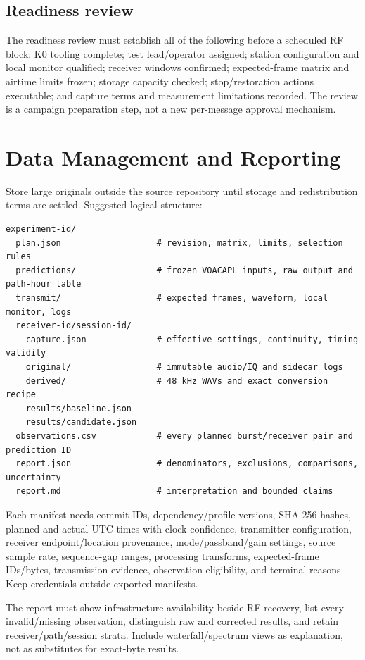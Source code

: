 \documentclass[11pt,a4paper]{article}
\begin{document}
\subsection{Readiness review}
\label{tp:readiness}

The readiness review must establish all of the following before a scheduled RF block: K0 tooling complete; test lead/operator assigned; station configuration and local monitor qualified; receiver windows confirmed; expected-frame matrix and airtime limits frozen; storage capacity checked; stop/restoration actions executable; and capture terms and measurement limitations recorded. The review is a campaign preparation step, not a new per-message approval mechanism.


\section{Data Management and Reporting}
\label{md:10}

Store large originals outside the source repository until storage and redistribution terms are settled. Suggested logical structure:

\begin{lstlisting}
experiment-id/
  plan.json                   # revision, matrix, limits, selection rules
  predictions/                # frozen VOACAPL inputs, raw output and path-hour table
  transmit/                   # expected frames, waveform, local monitor, logs
  receiver-id/session-id/
    capture.json              # effective settings, continuity, timing validity
    original/                 # immutable audio/IQ and sidecar logs
    derived/                  # 48 kHz WAVs and exact conversion recipe
    results/baseline.json
    results/candidate.json
  observations.csv            # every planned burst/receiver pair and prediction ID
  report.json                 # denominators, exclusions, comparisons, uncertainty
  report.md                   # interpretation and bounded claims
\end{lstlisting}
Each manifest needs commit IDs, dependency/profile versions, SHA-256 hashes, planned and actual UTC times with clock confidence, transmitter configuration, receiver endpoint/location provenance, mode/passband/gain settings, source sample rate, sequence-gap ranges, processing transforms, expected-frame IDs/bytes, transmission evidence, observation eligibility, and terminal reasons. Keep credentials outside exported manifests.

The report must show infrastructure availability beside RF recovery, list every invalid/missing observation, distinguish raw and corrected results, and retain receiver/path/session strata. Include waterfall/spectrum views as explanation, not as substitutes for exact-byte results.
\end{document}
